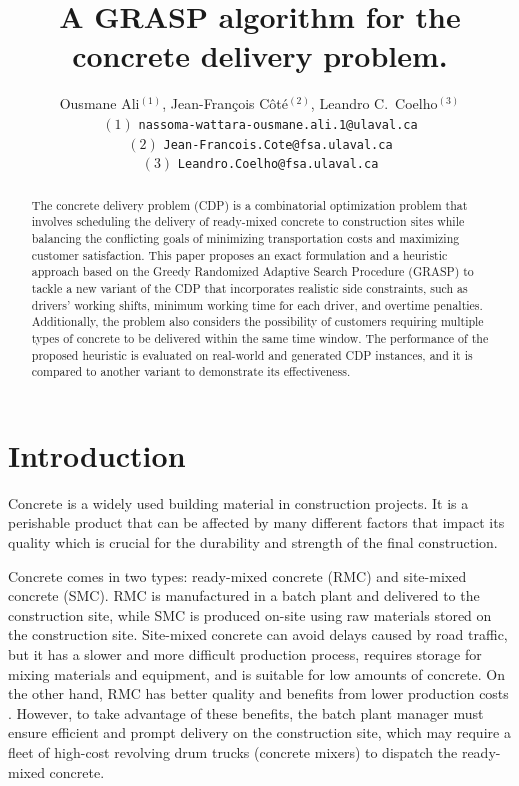 \documentclass{article}
\title{A GRASP algorithm for the concrete delivery problem. }
\author{Ousmane Ali$^{(1)}$, Jean-Fran\c cois C\^ot\'e$^{(2)}$, Leandro C.~Coelho$^{(3)}$\\
 $(1)$ {\tt nassoma-wattara-ousmane.ali.1@ulaval.ca}\\
 $(2)$ {\tt Jean-Francois.Cote@fsa.ulaval.ca}\\
 $(3)$ {\tt Leandro.Coelho@fsa.ulaval.ca}\\
}
\begin{document}
\maketitle
\begin{abstract}
   The concrete delivery problem (CDP) is a combinatorial optimization problem that involves scheduling the delivery of ready-mixed concrete to construction sites while balancing the conflicting goals of minimizing transportation costs and maximizing customer satisfaction. This paper proposes an exact formulation and a heuristic approach based on the Greedy Randomized Adaptive Search Procedure (GRASP) to tackle a new variant of the CDP that incorporates realistic side constraints, such as drivers' working shifts, minimum working time for each driver, and overtime penalties. Additionally, the problem also considers the possibility of customers requiring multiple types of concrete to be delivered within the same time window. The performance of the proposed heuristic is evaluated on real-world and generated CDP instances, and it is compared to another variant to demonstrate its effectiveness.
    
\end{abstract}



\section{Introduction}
\label{sec:intro}
Concrete is a widely used building material in construction projects. It is a perishable product that can be affected by many different factors that impact its quality \citep{sinha_quality_2021} which is crucial for the durability and strength of the final construction.

Concrete comes in two types: ready-mixed concrete (RMC) and site-mixed concrete (SMC). RMC is manufactured in a batch plant and delivered to the construction site, while SMC is produced on-site using raw materials stored on the construction site. Site-mixed concrete can avoid delays caused by road traffic, but it has a slower and more difficult production process, requires storage for mixing materials and equipment, and is suitable for low amounts of concrete. On the other hand, RMC has better quality and benefits from lower production costs \citep{muresan_comparing}. However, to take advantage of these benefits, the batch plant manager must ensure efficient and prompt delivery on the construction site, which may require a fleet of high-cost revolving drum trucks (concrete mixers) to dispatch the ready-mixed concrete.
\end{document}
